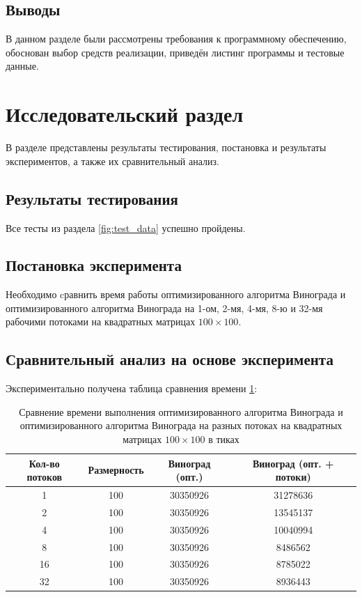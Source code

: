 \documentclass[a4paper,12pt]{article}
\begin{document}
\subsection*{Выводы}

В данном разделе были рассмотрены требования к 
программному обеспечению, обоснован выбор средств 
реализации, приведён листинг программы и тестовые 
данные.

\section{Исследовательский раздел}

В разделе представлены результаты тестирования, постановка и результаты экспериментов, а также их сравнительный анализ.

\subsection{Результаты тестирования}

Все тесты из раздела \ref{fig:test_data} 
успешно пройдены.

\subsection{Постановка эксперимента}

Необходимо cравнить время работы оптимизированного алгоритма Винограда и оптимизированного алгоритма Винограда на 1-ом, 2-мя, 4-мя, 8-ю и 32-мя рабочими потоками на квадратных матрицах $100 \times 100$.

\subsection{Сравнительный анализ на основе эксперимента}

Экспериментально получена таблица сравнения времени
\ref{restable}:

\newpage

\begin{table} [h!]
	\begin{center}
		\caption{Сравнение времени выполнения оптимизированного алгоритма Винограда и оптимизированного алгоритма Винограда на разных потоках на квадратных матрицах $100 \times 100$ в тиках}
		\begin{tabular}{|c|c|c|c|}
			\hline 
			Кол-во потоков & Размерность & Виноград (опт.) & Виноград (опт. + потоки)\\ 
			\hline 
			1 & 100 & 30350926 & 31278636 \\ 
			\hline 
			2 & 100 & 30350926 & 13545137 \\ 
			\hline 
			4 & 100 & 30350926 & 10040994 \\ 
			\hline
			8 & 100 & 30350926 & 8486562 \\ 
			\hline 
			16 & 100 & 30350926 & 8785022 \\ 
			\hline 
			32 & 100 & 30350926 & 8936443 \\ 
			\hline
		\end{tabular}
		\label{restable}
	\end{center}
\end{table}
\end{document}
